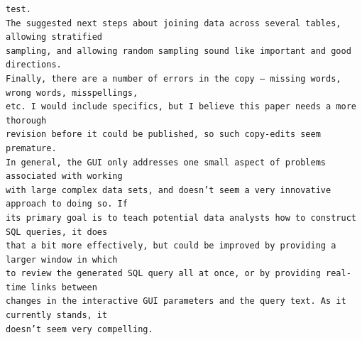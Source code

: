\documentclass[11pt]{tise_style}
\begin{document}
\begin{verbatim}
test.
The suggested next steps about joining data across several tables, allowing stratified
sampling, and allowing random sampling sound like important and good directions.
Finally, there are a number of errors in the copy – missing words, wrong words, misspellings,
etc. I would include specifics, but I believe this paper needs a more thorough
revision before it could be published, so such copy-edits seem premature.
In general, the GUI only addresses one small aspect of problems associated with working
with large complex data sets, and doesn’t seem a very innovative approach to doing so. If
its primary goal is to teach potential data analysts how to construct SQL queries, it does
that a bit more effectively, but could be improved by providing a larger window in which
to review the generated SQL query all at once, or by providing real-time links between
changes in the interactive GUI parameters and the query text. As it currently stands, it
doesn’t seem very compelling.
\end{verbatim}
\end{document}
